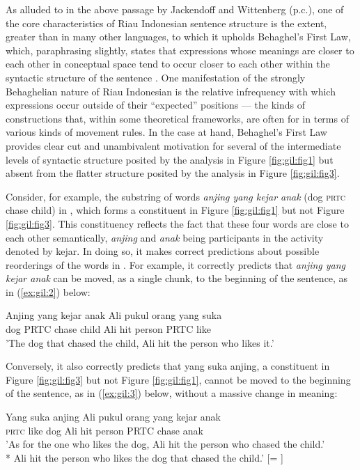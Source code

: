 \documentclass[output=paper,colorlinks,citecolor=brown
]{langscibook}
\begin{document}
As alluded to in the above passage by Jackendoff and Wittenberg (p.c.), one of the core characteristics of Riau Indonesian sentence structure is the extent, greater than in many other languages, to which it upholds Behaghel's First Law, which, paraphrasing slightly, states that expressions whose meanings are closer to each other in conceptual space tend to occur closer to each other within the syntactic structure of the sentence \citep{behaghel1932deutsche}.  One manifestation of the strongly Behaghelian nature of Riau Indonesian is the relative infrequency with which expressions occur outside of their ``expected'' positions — the kinds of constructions that, within some theoretical frameworks, are often for in terms of various kinds of movement rules.  In the case at hand, Behaghel's First Law provides clear cut and unambivalent motivation for several of the intermediate levels of syntactic structure posited by the analysis in Figure \ref{fig:gil:fig1} but absent from the flatter structure posited by the analysis in Figure \ref{fig:gil:fig3}.

Consider, for example, the substring of words \emph{anjing yang kejar anak} (dog \textsc{prtc} chase child) in , which forms a constituent in Figure \ref{fig:gil:fig1} but not Figure \ref{fig:gil:fig3}.  This constituency reflects the fact that these four words are close to each other semantically, \emph{anjing} and \emph{anak} being participants in the activity denoted by kejar.  In doing so, it makes correct predictions about possible reorderings of the words in .  For example, it correctly predicts that \emph{anjing yang kejar anak} can be moved, as a single chunk, to the beginning of the sentence, as in (\ref{ex:gil:2}) below:

\ea \label{ex:gil:2}
\gll Anjing	yang	kejar	anak	Ali	pukul	orang	yang	suka\\
 dog	PRTC	chase	child	Ali	hit	person	PRTC	like	\\
\glt 'The dog that chased the child, Ali hit the person who likes it.'
\z

Conversely, it also correctly predicts that yang suka anjing, a constituent in Figure \ref{fig:gil:fig3} but not Figure \ref{fig:gil:fig1}, cannot be moved to the beginning of the sentence, as in (\ref{ex:gil:3}) below, without a massive change in meaning:

\ea \label{ex:gil:3}
\gll Yang	suka	anjing	Ali	pukul	orang	yang	kejar	anak\\
 \textsc{prtc}	like	dog	Ali	hit	person	PRTC	chase	anak\\
\glt 'As for the one who likes the dog, Ali hit the person who chased the child.' \\
*	Ali hit the person who likes the dog that chased the child.' [= ]
\z
\end{document}

